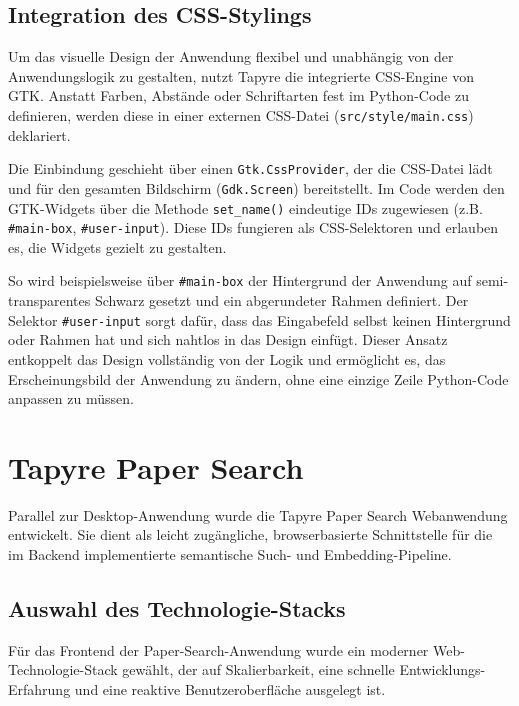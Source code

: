 \subsection{Integration des CSS-Stylings}
Um das visuelle Design der Anwendung flexibel und unabhängig von der Anwendungslogik zu gestalten, nutzt Tapyre die integrierte CSS-Engine von GTK. Anstatt Farben, Abstände oder Schriftarten fest im Python-Code zu definieren, werden diese in einer externen CSS-Datei (\texttt{src/style/main.css}) deklariert.



Die Einbindung geschieht über einen \texttt{Gtk.CssProvider}, der die CSS-Datei lädt und für den gesamten Bildschirm (\texttt{Gdk.Screen}) bereitstellt. Im Code werden den GTK-Widgets über die Methode \texttt{set\_name()} eindeutige IDs zugewiesen (z.B. \texttt{\#main-box}, \texttt{\#user-input}). Diese IDs fungieren als CSS-Selektoren und erlauben es, die Widgets gezielt zu gestalten.

So wird beispielsweise über \texttt{\#main-box} der Hintergrund der Anwendung auf semi-transparentes Schwarz gesetzt und ein abgerundeter Rahmen definiert. Der Selektor \texttt{\#user-input} sorgt dafür, dass das Eingabefeld selbst keinen Hintergrund oder Rahmen hat und sich nahtlos in das Design einfügt. Dieser Ansatz entkoppelt das Design vollständig von der Logik und ermöglicht es, das Erscheinungsbild der Anwendung zu ändern, ohne eine einzige Zeile Python-Code anpassen zu müssen.

\section{Tapyre Paper Search}

Parallel zur Desktop-Anwendung wurde die Tapyre Paper Search Webanwendung entwickelt. Sie dient als leicht zugängliche, browserbasierte Schnittstelle für die im Backend implementierte semantische Such- und Embedding-Pipeline.

\subsection{Auswahl des Technologie-Stacks}

Für das Frontend der Paper-Search-Anwendung wurde ein moderner Web-Technologie-Stack gewählt, der auf Skalierbarkeit, eine schnelle Entwicklungs-Erfahrung und eine reaktive Benutzeroberfläche ausgelegt ist.

